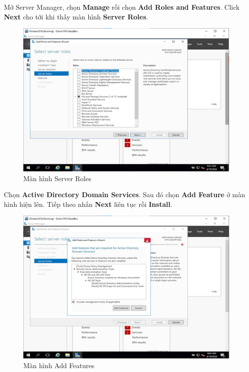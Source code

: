  Mở Server Manager, chọn \textbf{Manage} rồi chọn \textbf{Add Roles and Features}. Click \textbf{Next} cho tới khi thấy màn hình \textbf{Server Roles}.

\begin{figure}[!htb]
    \centering
    \includegraphics[width=0.9\linewidth]{figure//chapter4//lab4_1/select_add_roles_and_features.png}
    \caption{Màn hình Server Roles}
    \label{fig:enter-label}
\end{figure}


 Chọn \textbf{Active Directory Domain Services}. Sau đó chọn \textbf{Add Feature} ở màn hình hiện lên. Tiếp theo nhấn \textbf{Next} liên tục rồi \textbf{Install}.

\begin{figure}[!htb]
    \centering
    \includegraphics[width=0.9\linewidth]{figure//chapter4//lab4_1/add_feature.png}
    \caption{Màn hình Add Features}
    \label{fig:enter-label}
\end{figure}

